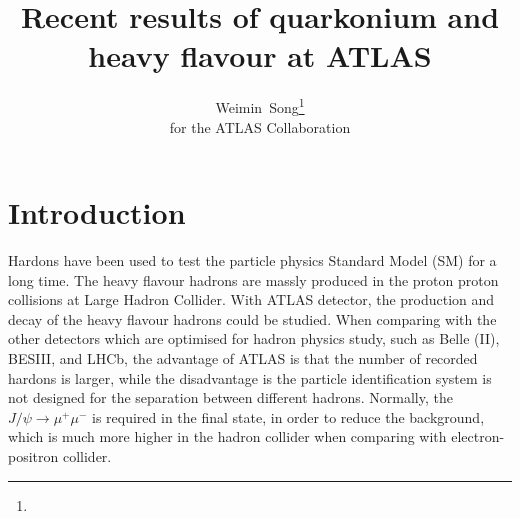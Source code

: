 \documentclass[epj]{webofc}
\begin{document}
%
\title{Recent results of quarkonium and heavy flavour at ATLAS}

\author{Weimin~Song\fnsep\thanks{}
       \\for the ATLAS Collaboration
}


%
\maketitle
%
\section{Introduction}
\label{intro}

Hardons have been used to test the particle physics Standard Model (SM) for a long time.
The heavy flavour hadrons are massly produced in the proton proton collisions at Large Hadron Collider.
With ATLAS detector, the production and decay of the heavy flavour hadrons could be studied. 
When comparing with the other detectors which are optimised for hadron physics study, such as Belle (II), BESIII, and
LHCb, the advantage of ATLAS is that the number of recorded hardons is larger, while the disadvantage is the particle identification 
system is not designed for the separation between different hadrons. 
Normally, the $J/\psi \to \mu^{+} \mu^{-}$ is required in the final state, in order to reduce the background, which is much more
higher in the hadron collider when comparing with electron-positron collider.\\ 
\end{document}

